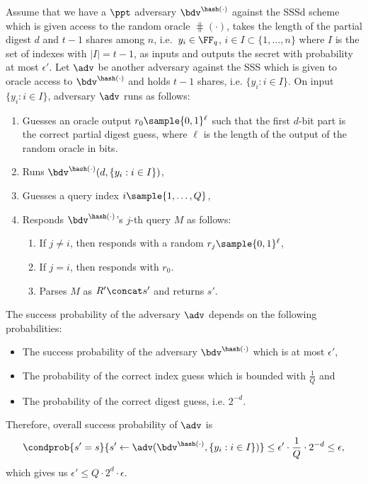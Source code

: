 \documentclass[envcountsame,runningheads,notitlepage]{llncs}
\begin{document}
	\begin{pf}
		Assume that we have a $\ppt$ adversary  $\bdv^{\hash(\cdot)}$ against the SSSd scheme which is given access to the random oracle $\hash(\cdot)$, takes the length of the partial digest $d$ and $t-1$ shares among $n$, i.e.~$y_i \in \FF_q$, $i \in I \subset \{1, \ldots, n\}$ where $I$ is the set of indexes with $|I| = t - 1$, as inputs and outputs the secret with probability at most $\epsilon'$.
		Let $\adv$ be another adversary against the SSS which is given to oracle access to $\bdv^{\hash(\cdot)}$ and holds $t-1$ shares, i.e. $\{y_i: i \in I\}$.
		On input $\{y_i: i \in I\}$, adversary $\adv$ runs as follows:
		\begin{enumerate}
			\item Guesses an oracle output $r_{0} \sample \{0,1\}^{\ell}$ such that the first $d$-bit part is the correct partial digest guess, where $\ell$ is the length of the output of the random oracle in bits.
			\item Runs $\bdv^{\hash(\cdot)}(d, \{y_i: i \in I\})$, 
			\item Guesses a query index $i \sample \{1, \ldots, Q\}$,
			\item Responds $\bdv^{\hash(\cdot)}$'s $j$-th query $M$ as follows:
			\begin{enumerate}
				\item If $j \neq i$, then responds with a random $r_{j} \sample \{0,1\}^{\ell}$, 
				\item If $j = i$, then responds with $r_{0}$.	
				\item Parses $M$ as $R'\concat s'$ and returns $s'$.
			\end{enumerate}
		\end{enumerate} 
		The success probability of the adversary $\adv$ depends on the following probabilities:
		\begin{itemize}
			\item The success probability of the adversary $\bdv^{\hash(\cdot)}$ which is at most $\epsilon'$,
			\item The probability of the correct index guess which is bounded with $\frac{1}{Q}$ and 
			\item The probability of the correct digest guess, i.e. $2^{-d}$.
		\end{itemize}
		Therefore, overall success probability of $\adv$ is 
		\begin{equation*}
		\condprob{s' = s}{s' \leftarrow \adv(\bdv^{\hash(\cdot)}, \{y_i: i \in I\})} \leq \epsilon' \cdot \frac{1}{Q} \cdot 2^{-d} \leq \epsilon,
		\end{equation*}
		which gives us $\epsilon' \leq Q \cdot 2^{d} \cdot \epsilon$. 
	\end{pf}
\end{document}
